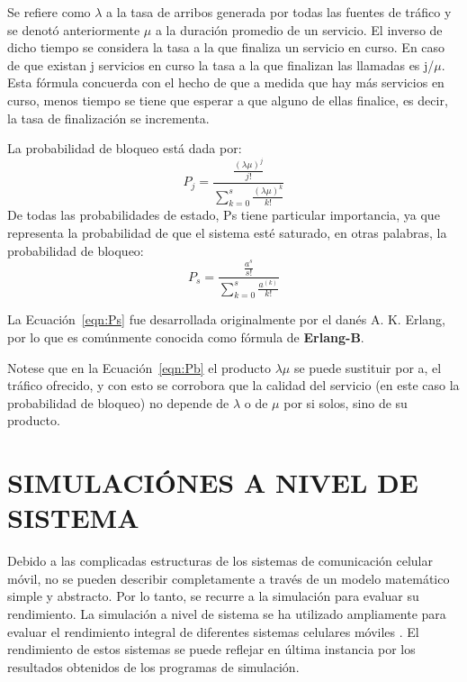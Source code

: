  Se refiere como $\lambda$ a la tasa de arribos generada por todas las fuentes de tráfico y se denotó anteriormente $\mu$ a la duración promedio de un servicio. El inverso de dicho tiempo se considera la tasa a la que finaliza un servicio en curso. En caso de que existan j servicios en curso la tasa a la que finalizan las llamadas es j/$\mu$. Esta fórmula concuerda con el hecho de que a medida que hay más servicios en curso, menos tiempo se tiene que esperar a que alguno de ellas finalice, es decir, la tasa de finalización se incrementa.

 La probabilidad de bloqueo está dada por:
\begin{equation}
    P_{j}=\frac{\frac{(\lambda\mu)^{j}}{j!}}{\sum_{k=0}^{s}\frac{(\lambda\mu)^{k}}{k!}}
    \label{eqn:Pb}
\end{equation} 
De todas las probabilidades de estado, Ps tiene particular importancia, ya que representa la probabilidad de que el sistema esté saturado, en otras palabras, la probabilidad de bloqueo:
\begin{equation}
    P_{s}=\frac{\frac{a^{s}}{s!}}{\sum_{k=0}^{s}\frac{a^(k)}{k!}}
    \label{eqn:Ps}
\end{equation} 

La Ecuación~\ref{eqn:Ps} fue desarrollada originalmente por el danés A. K. Erlang, por lo que es comúnmente conocida como fórmula de \textbf{Erlang-B}.\newline

Notese que en la Ecuación~\ref{eqn:Pb} el producto $\lambda \mu$ se puede sustituir por a, el tráfico ofrecido, y con esto se corrobora que la calidad del servicio (en este caso la probabilidad de bloqueo) no depende de $\lambda$ o de $\mu$ por si solos, sino de su producto.


\section{SIMULACIÓNES A NIVEL DE SISTEMA}

Debido a las complicadas estructuras de los sistemas de comunicación celular móvil, no se pueden describir completamente a través de un modelo matemático simple y abstracto. Por lo tanto, se recurre a la simulación para evaluar su rendimiento. La simulación a nivel de sistema se ha utilizado ampliamente para evaluar el rendimiento integral de diferentes sistemas celulares móviles \parencite{Chen2011}. El rendimiento de estos sistemas se puede reflejar en última instancia por los resultados obtenidos de los programas de simulación.\newline

